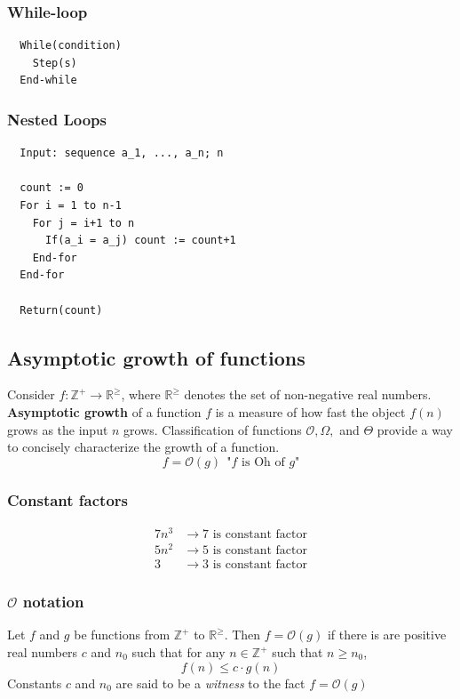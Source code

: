 \subsubsection*{While-loop}
\begin{lstlisting}
  While(condition)
    Step(s)
  End-while
\end{lstlisting}

\subsubsection*{Nested Loops}
\begin{lstlisting}
  Input: sequence a_1, ..., a_n; n

  count := 0
  For i = 1 to n-1
    For j = i+1 to n
      If(a_i = a_j) count := count+1
    End-for
  End-for

  Return(count)
\end{lstlisting}

\subsection{Asymptotic growth of functions}
Consider $f: \mathbb{Z}^+ \rightarrow \mathbb{R}^{\geq}$, where $\mathbb{R}^{\geq}$ denotes the set of non-negative real numbers.
\textbf{Asymptotic growth} of a function $f$ is a measure of how fast the object $f(n)$ grows as the input $n$ grows.
Classification of functions $\mathcal{O}, \Omega,$ and $\Theta$ provide a way to concisely characterize the growth of a function.
\[
  f = \mathcal{O}(g)~~\text{"$f$ is Oh of $g$"}
\]

\subsubsection*{Constant factors}
\begin{align*}
  7n^3 & \rightarrow 7 \text{ is constant factor} \\
  5n^2 & \rightarrow 5 \text{ is constant factor} \\
  3    & \rightarrow 3 \text{ is constant factor}
\end{align*}

\subsubsection*{$\mathcal{O}$ notation}
Let $f$ and $g$ be functions from $\mathbb{Z}^+$ to $\mathbb{R}^{\geq}$.
Then $f=\mathcal{O}(g)$ if there is are positive real numbers $c$ and $n_0$ such that for any $n \in \mathbb{Z}^+$ such that $n \geq n_0$,
\[
  f(n) \leq c \cdot g(n)
\]
Constants $c$ and $n_0$ are said to be a \textit{witness} to the fact $f=\mathcal{O}(g)$

